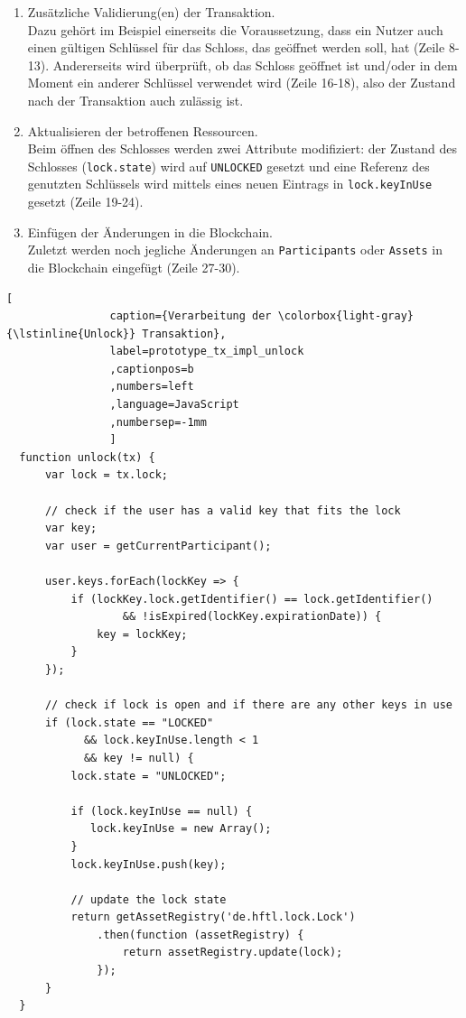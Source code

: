             \begin{enumerate}
                \item Zusätzliche Validierung(en) der Transaktion.\smallskip\\
                    Dazu gehört im Beispiel einerseits die Voraussetzung, dass ein Nutzer auch einen gültigen Schlüssel für das Schloss, das geöffnet werden soll, hat (Zeile 8-13). 
                    Andererseits wird überprüft, ob das Schloss geöffnet ist und/oder in dem Moment ein anderer Schlüssel verwendet wird (Zeile 16-18), also der Zustand nach der Transaktion auch zulässig ist.
                \item Aktualisieren der betroffenen Ressourcen.\smallskip\\
                    Beim öffnen des Schlosses werden zwei Attribute modifiziert: der Zustand des Schlosses (\colorbox{light-gray}{\lstinline{lock.state}}) wird auf \colorbox{light-gray}{\lstinline{UNLOCKED}} gesetzt und eine Referenz des genutzten Schlüssels wird mittels eines neuen Eintrags in \colorbox{light-gray}{\lstinline{lock.keyInUse}} gesetzt (Zeile 19-24).
                \item Einfügen der Änderungen in die Blockchain.\smallskip\\
                    Zuletzt werden noch jegliche Änderungen an \colorbox{light-gray}{\lstinline{Participants}} oder \colorbox{light-gray}{\lstinline{Assets}} in die Blockchain eingefügt (Zeile 27-30).
            \end{enumerate}
            \medskip
            \begin{lstlisting}[
                caption={Verarbeitung der \colorbox{light-gray}{\lstinline{Unlock}} Transaktion},
                label=prototype_tx_impl_unlock
                ,captionpos=b
                ,numbers=left
                ,language=JavaScript
                ,numbersep=-1mm
                ]
  function unlock(tx) {
      var lock = tx.lock;
 
      // check if the user has a valid key that fits the lock 
      var key;
      var user = getCurrentParticipant();

      user.keys.forEach(lockKey => {
          if (lockKey.lock.getIdentifier() == lock.getIdentifier()
                  && !isExpired(lockKey.expirationDate)) {
              key = lockKey;
          }
      });

      // check if lock is open and if there are any other keys in use
      if (lock.state == "LOCKED"
            && lock.keyInUse.length < 1
            && key != null) {
          lock.state = "UNLOCKED";
 
          if (lock.keyInUse == null) {
             lock.keyInUse = new Array();
          }
          lock.keyInUse.push(key);

          // update the lock state
          return getAssetRegistry('de.hftl.lock.Lock')
              .then(function (assetRegistry) {
                  return assetRegistry.update(lock);
              });
      }
  }
            \end{lstlisting}

